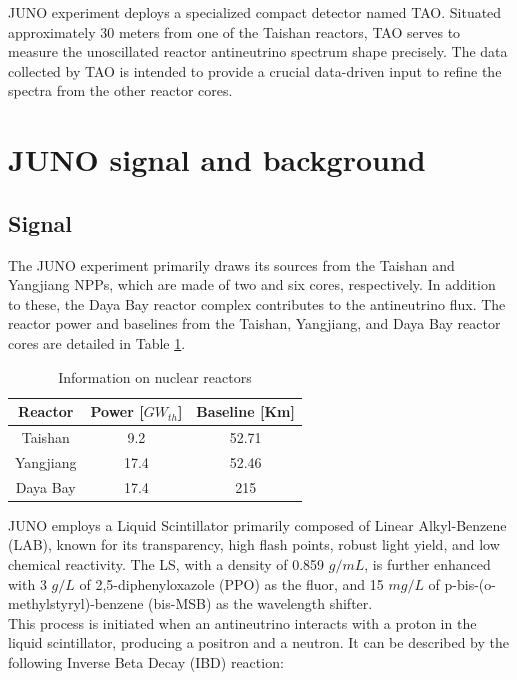 JUNO experiment deploys a specialized compact detector named TAO. Situated approximately 30 meters from one of the Taishan reactors, TAO serves to measure the unoscillated reactor antineutrino spectrum shape precisely. The data collected by TAO is intended to provide a crucial data-driven input to refine the spectra from the other reactor cores. \\

\newpage

\section{JUNO signal and background}

\subsection{Signal}
The JUNO experiment primarily draws its sources from the Taishan and Yangjiang NPPs, which are made of two and six cores, respectively. In addition to these, the Daya Bay reactor complex contributes to the antineutrino flux. The reactor power and baselines from the Taishan, Yangjiang, and Daya Bay reactor cores are detailed in Table \ref{tab:IBD_reactor_source}.


\begin{table}[htp]
	\centering
        \small
	\begin{tabular}{ccc}
		\toprule
		Reactor & Power [$GW_{th}$] & Baseline [Km]   \\\midrule
		Taishan & 9.2 & 52.71 	\\
		Yangjiang & 17.4 & 52.46 	\\
		Daya Bay & 17.4 & 215 \\
		\bottomrule
	\end{tabular}
	\caption{Information on nuclear reactors}
	\label{tab:IBD_reactor_source}
\end{table}


JUNO employs a Liquid Scintillator primarily composed of Linear Alkyl-Benzene (LAB), known for its transparency, high flash points, robust light yield, and low chemical reactivity. The LS, with a density of 0.859 $g/mL$, is further enhanced with 3 $g/L$ of 2,5-diphenyloxazole (PPO) as the fluor, and 15 $mg/L$ of p-bis-(o-methylstyryl)-benzene (bis-MSB) as the wavelength shifter. \\

This process is initiated when an antineutrino interacts with a proton in the liquid scintillator, producing a positron and a neutron. It can be described by the following Inverse Beta Decay (IBD) reaction:

